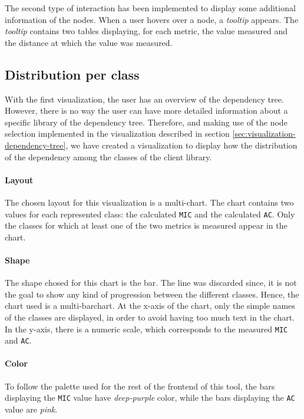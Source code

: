 The second type of interaction has been implemented to display some additional information of the nodes. When a user hovers over a node, a \textit{tooltip} appears. The \textit{tooltip} contains two tables displaying, for each metric, the value measured and the distance at which the value was measured.

\subsection{Distribution per class}
With the first visualization, the user has an overview of the dependency tree. However, there is no way the user can have more detailed information about a specific library of the dependency tree. Therefore, and making use of the node selection implemented in the visualization described in section \ref{sec:visualization-dependency-tree}, we have created a visualization to display how the distribution of the dependency among the classes of the client library.

\paragraph{Layout}
The chosen layout for this visualization is a multi-chart. The chart contains two values for each represented class: the calculated \texttt{MIC} and the calculated \texttt{AC}. Only the classes for which at least one of the two metrics is measured appear in the chart. 

\paragraph{Shape}
The shape chosed for this chart is the bar. The line was discarded since, it is not the goal to show any kind of progression between the different classes. Hence, the chart used is a multi-barchart.
At the x-axis of the chart, only the simple names of the classes are displayed, in order to avoid having too much text in the chart. In the y-axis, there is a numeric scale, which corresponds to the measured \texttt{MIC} and \texttt{AC}.

\paragraph{Color}
To follow the palette used for the rest of the frontend of this tool, the bars displaying the \texttt{MIC} value have \textit{deep-purple} color, while the bars displaying the \texttt{AC} value are \textit{pink}.

